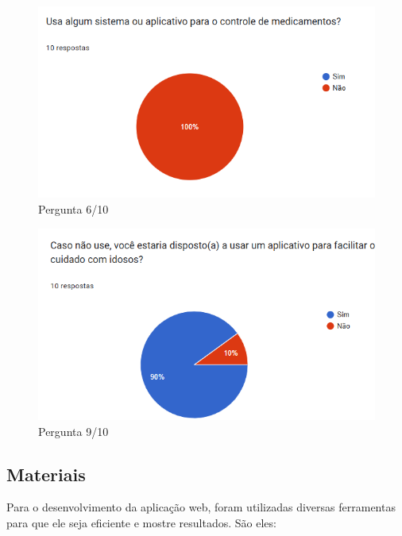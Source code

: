 \documentclass[
	article,			%
	12pt,				%
	oneside,			%
	a4paper,			%
    BIBLATEX,           %
	english,			%
	brazil,				%
	sumario=tradicional
	]{abntex2}
\begin{document}
\begin{figure}[!htbp]
    \centering
    \includegraphics[width=1.0\linewidth]{Figuras/utiliza-app.png}
    \caption{Pergunta 6/10}
\end{figure}

\begin{figure}[!htbp]
    \centering
    \includegraphics[width=1.0\linewidth]{Figuras/utilizaria-app.png}
    \caption{Pergunta 9/10}
\end{figure}
\clearpage

\subsection{Materiais}

Para o desenvolvimento da aplicação web, foram utilizadas diversas ferramentas para que ele seja eficiente e mostre resultados. São eles:
\end{document}
